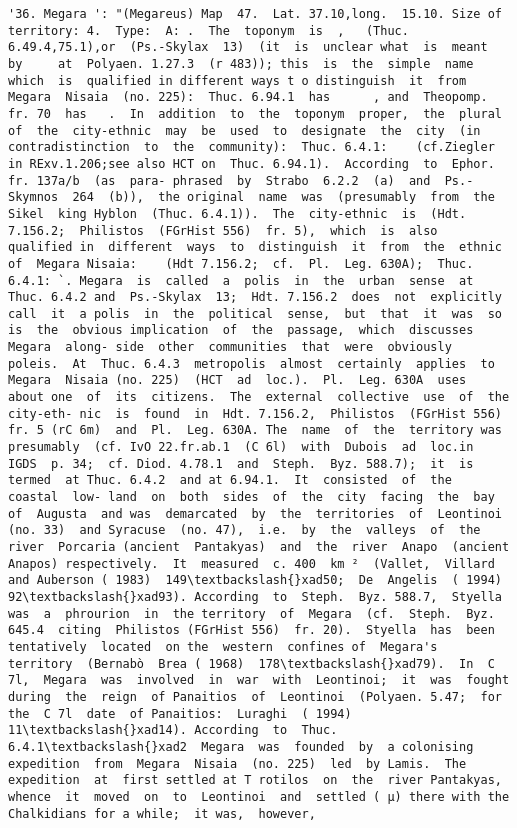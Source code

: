 \documentclass[11pt]{article}
\begin{document}
\begin{Verbatim}[commandchars=\\\{\}]
         '36. Megara ': "(Megareus) Map  47.  Lat. 37.10,long.  15.10. Size of  territory: 4.  Type:  A: .  The  toponym  is  ,   (Thuc. 6.49.4,75.1),or  (Ps.-Skylax  13)  (it  is  unclear what  is  meant  by     at  Polyaen. 1.27.3  (r 483)); this  is  the  simple  name  which  is  qualified in different ways t o distinguish  it  from  Megara  Nisaia  (no. 225):  Thuc. 6.94.1  has      , and  Theopomp.  fr. 70  has   .  In  addition  to  the  toponym  proper,  the  plural  of  the  city-ethnic  may  be  used  to  designate  the  city  (in  contradistinction  to  the  community):  Thuc. 6.4.1:    (cf.Ziegler in RExv.1.206;see also HCT on  Thuc. 6.94.1).  According  to  Ephor.  fr. 137a/b  (as  para- phrased  by  Strabo  6.2.2  (a)  and  Ps.-Skymnos  264  (b)),  the original  name  was  (presumably  from  the  Sikel  king Hyblon  (Thuc. 6.4.1)).  The  city-ethnic  is  (Hdt. 7.156.2;  Philistos  (FGrHist 556)  fr. 5),  which  is  also  qualified in  different  ways  to  distinguish  it  from  the  ethnic  of  Megara Nisaia:    (Hdt 7.156.2;  cf.  Pl.  Leg. 630A);  Thuc. 6.4.1: `. Megara  is  called  a  polis  in  the  urban  sense  at  Thuc. 6.4.2 and  Ps.-Skylax  13;  Hdt. 7.156.2  does  not  explicitly  call  it  a polis  in  the  political  sense,  but  that  it  was  so  is  the  obvious implication  of  the  passage,  which  discusses  Megara  along- side  other  communities  that  were  obviously  poleis.  At  Thuc. 6.4.3  metropolis  almost  certainly  applies  to  Megara  Nisaia (no. 225)  (HCT  ad  loc.).  Pl.  Leg. 630A  uses  about one  of  its  citizens.  The  external  collective  use  of  the  city-eth- nic  is  found  in  Hdt. 7.156.2,  Philistos  (FGrHist 556)  fr. 5 (rC 6m)  and  Pl.  Leg. 630A. The  name  of  the  territory was  presumably  (cf. IvO 22.fr.ab.1  (C 6l)  with  Dubois  ad  loc.in  IGDS  p. 34;  cf. Diod. 4.78.1  and  Steph.  Byz. 588.7);  it  is  termed  at Thuc. 6.4.2  and at 6.94.1.  It  consisted  of  the  coastal  low- land  on  both  sides  of  the  city  facing  the  bay  of  Augusta  and was  demarcated  by  the  territories  of  Leontinoi  (no. 33)  and Syracuse  (no. 47),  i.e.  by  the  valleys  of  the  river  Porcaria (ancient  Pantakyas)  and  the  river  Anapo  (ancient  Anapos) respectively.  It  measured  c. 400  km ²  (Vallet,  Villard  and Auberson ( 1983)  149\textbackslash{}xad50;  De  Angelis  ( 1994)  92\textbackslash{}xad93). According  to  Steph.  Byz. 588.7,  Styella  was  a  phrourion  in  the territory  of  Megara  (cf.  Steph.  Byz. 645.4  citing  Philistos (FGrHist 556)  fr. 20).  Styella  has  been  tentatively  located  on the  western  confines of  Megara's  territory  (Bernabò  Brea ( 1968)  178\textbackslash{}xad79).  In  C 7l,  Megara  was  involved  in  war  with  Leontinoi;  it  was  fought  during  the  reign  of Panaitios  of  Leontinoi  (Polyaen. 5.47;  for  the  C 7l  date  of Panaitios:  Luraghi  ( 1994)  11\textbackslash{}xad14). According  to  Thuc. 6.4.1\textbackslash{}xad2  Megara  was  founded  by  a colonising  expedition  from  Megara  Nisaia  (no. 225)  led  by Lamis.  The  expedition  at  first settled at T rotilos  on  the  river Pantakyas,  whence  it  moved  on  to  Leontinoi  and  settled ( µ) there with the Chalkidians for a while;  it was,  however,  
\end{Verbatim}
\end{document}
